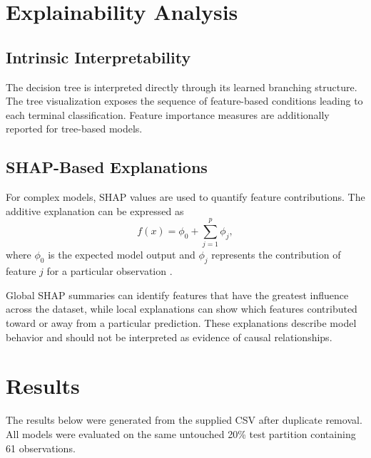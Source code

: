 \documentclass[10pt]{article}
\begin{document}
\section{Explainability Analysis}

\subsection{Intrinsic Interpretability}
The decision tree is interpreted directly through its learned branching structure. The tree visualization exposes the sequence of feature-based conditions leading to each terminal classification. Feature importance measures are additionally reported for tree-based models.

\subsection{SHAP-Based Explanations}
For complex models, SHAP values are used to quantify feature contributions. The additive explanation can be expressed as
\begin{equation}
f(x)=\phi_0+\sum_{j=1}^{p}\phi_j,
\end{equation}
where $\phi_0$ is the expected model output and $\phi_j$ represents the contribution of feature $j$ for a particular observation \citep{lundberg2017unified}.

Global SHAP summaries can identify features that have the greatest influence across the dataset, while local explanations can show which features contributed toward or away from a particular prediction. These explanations describe model behavior and should not be interpreted as evidence of causal relationships.

\section{Results}
The results below were generated from the supplied CSV after duplicate removal. All models were evaluated on the same untouched 20\% test partition containing 61 observations.
\end{document}
